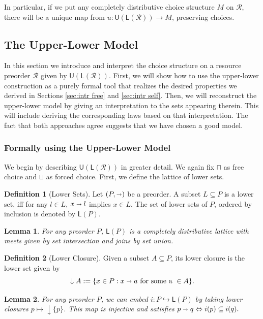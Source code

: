 \documentclass[12pt]{article}
\theoremstyle{definition}
\newtheorem{definition}{Definition}[section]
\theoremstyle{plain}
\newtheorem{lemma}{Lemma}[section]
\theoremstyle{plain}
\theoremstyle{plain}
\theoremstyle{plain}
\theoremstyle{remark}
\theoremstyle{remark}
\newcommand{\mc}[1]{\mathcal{#1}}
\newcommand{\sub}{\subseteq}
\newcommand{\low}{\mathsf{L}}
\newcommand{\upper}{\mathsf{U}}
\begin{document}
In particular, if we put any completely distributive choice structure $M$ on $\mc{R}$, there will be a unique map from $u: \upper(\low(\mc{R})) \rightarrow M$, preserving choices. 

\subsection{The Upper-Lower Model}\label{sec:upper-lower model}
In this section we introduce and interpret the choice structure on a resource preorder $\mc{R}$ given by $\upper(\low(\mc{R}))$. First, we will show how to use the upper-lower construction as a purely formal tool that realizes the desired properties we derived in Sections \ref{sec:intr free} and \ref{sec:intr self}. Then, we will reconstruct the upper-lower model by giving an interpretation to the sets appearing therein. This will include deriving the corresponding laws based on that interpretation. The fact that both approaches agree suggests that we have chosen a good model.

\subsubsection{Formally using the Upper-Lower Model}
We begin by describing $\upper(\low(\mc{R}))$ in greater detail. We again fix $\sqcap$ as free choice and $\sqcup$ as forced choice. First, we define the lattice of lower sets.

\begin{definition}[Lower Sets]
	Let $(P,\shortrightarrow)$ be a preorder. A subset $L \sub P$ is a lower set, iff for any $l \in L$, $x \shortrightarrow l$ implies $x \in L$. The set of lower sets of $P$, ordered by inclusion is denoted by $\low(P)$. 
\end{definition}

\begin{lemma}
	For any preorder $P$, $\low(P)$ is a completely distributive lattice with meets given by set intersection and joins by set union.
\end{lemma}

\begin{definition}[Lower Closure]
	Given a subset $A \sub P$, its lower closure is the lower set given by $$\downarrow A := \{x \in P: x \shortrightarrow a \text{ for some a } \in A\}.$$
\end{definition} 

\begin{lemma}
	For any preorder $P$, we can embed $i: P \hookrightarrow \low(P)$ by taking lower closures $p \mapsto \downarrow \{p\}$. This map is injective and satisfies $p \shortrightarrow q \Leftrightarrow i(p) \sub i(q).$ 
\end{lemma}
\end{document}
